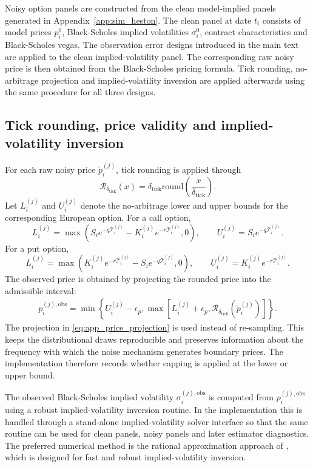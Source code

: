 \documentclass[11pt,a4paper,notitlepage]{article}
\numberwithin{equation}{section}
\begin{document}
Noisy option panels are constructed from the clean model-implied panels generated in Appendix~\ref{app:sim_heston}. The clean panel at date \(t_i\) consists of model prices \(p_i^0\), Black-Scholes implied volatilities \(\sigma_i^0\), contract characteristics and Black-Scholes vegas. The observation error designs introduced in the main text are applied to the clean implied-volatility panel.  The corresponding raw noisy price is then obtained from the Black-Scholes pricing formula. Tick rounding, no-arbitrage projection and implied-volatility inversion are applied afterwards using the same procedure for all three designs.


\subsection{Tick rounding, price validity and implied-volatility inversion}
For each raw noisy price $\tilde p_i^{(j)}$, tick rounding is applied through
\[
\mathcal{R}_{\delta_{\mathrm{tick}}}(x)
=
\delta_{\mathrm{tick}}
\mathrm{round}\left(\frac{x}{\delta_{\mathrm{tick}}}\right).
\]
Let $L_i^{(j)}$ and $U_i^{(j)}$ denote the no-arbitrage lower and upper bounds for the corresponding European
option. For a call option,
\[
L_i^{(j)}=\max\left(S_ie^{-q\mathcal T_i^{(j)}}-K_i^{(j)}e^{-r\mathcal T_i^{(j)}},0\right),
\qquad
U_i^{(j)}=S_ie^{-q\mathcal T_i^{(j)}}.
\]
For a put option,
\[
L_i^{(j)}=\max\left(K_i^{(j)}e^{-r\mathcal T_i^{(j)}}-S_ie^{-q\mathcal T_i^{(j)}},0\right),
\qquad
U_i^{(j)}=K_i^{(j)}e^{-r\mathcal T_i^{(j)}}.
\]
The observed price is obtained by projecting the rounded price into the admissible interval:
\begin{align}
p_i^{(j),\mathrm{obs}}
=
\min\left\{
U_i^{(j)}-\epsilon_p,
\max\left[
L_i^{(j)}+\epsilon_p,
\mathcal{R}_{\delta_{\mathrm{tick}}}\left(\tilde p_i^{(j)}\right)
\right]
\right\}.
\label{eq:app_price_projection}
\end{align}
The projection in \eqref{eq:app_price_projection} is used instead of re-sampling. This keeps the distributional
draws reproducible and preserves information about the frequency with which the noise mechanism generates boundary
prices. The implementation therefore records whether capping is applied at the lower or upper bound.

The observed Black-Scholes implied volatility $\sigma_i^{(j),\mathrm{obs}}$ is computed from
$p_i^{(j),\mathrm{obs}}$ using a robust implied-volatility inversion routine. In the implementation this is handled
through a stand-alone implied-volatility solver interface so that the same routine can be used for clean panels,
noisy panels and later estimator diagnostics. The preferred numerical method is the rational approximation
approach of \citet{jaeckel2015lets}, which is designed for fast and robust implied-volatility inversion.
\end{document}
